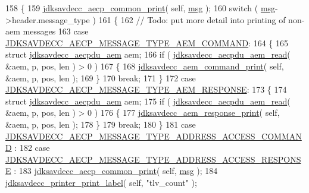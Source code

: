 \begin{DoxyCode}
158 \{
159     \hyperlink{group__aecp__print_gabf23e817595afca199205bb410a5eca6}{jdksavdecc\_aecp\_common\_print}( \textcolor{keyword}{self}, \hyperlink{maap__log__linux_8c_a0c7e58a50354c4a4d6dad428d0e47029}{msg} );
160     \textcolor{keywordflow}{switch} ( \hyperlink{maap__log__linux_8c_a0c7e58a50354c4a4d6dad428d0e47029}{msg}->header.message\_type )
161     \{
162     \textcolor{comment}{// Todo: put more detail into printing of non-aem messages}
163     \textcolor{keywordflow}{case} \hyperlink{group__aecp__message__type_ga4625ce189cc209f42deb0629f48faf69}{JDKSAVDECC\_AECP\_MESSAGE\_TYPE\_AEM\_COMMAND}:
164     \{
165         \textcolor{keyword}{struct }\hyperlink{structjdksavdecc__aecpdu__aem}{jdksavdecc\_aecpdu\_aem} aem;
166         \textcolor{keywordflow}{if} ( \hyperlink{group__aecpdu__aem_gae2421015dcdce745b4f03832e12b4fb6}{jdksavdecc\_aecpdu\_aem\_read}( &aem, p, pos, len ) > 0 )
167         \{
168             \hyperlink{group__aem__print_gae1e2e8e45252cd16a6f95d590870a6ea}{jdksavdecc\_aem\_command\_print}( \textcolor{keyword}{self}, &aem, p, pos, len );
169         \}
170         \textcolor{keywordflow}{break};
171     \}
172     \textcolor{keywordflow}{case} \hyperlink{group__aecp__message__type_ga9cad401e0f60634a8f084d93b0374d31}{JDKSAVDECC\_AECP\_MESSAGE\_TYPE\_AEM\_RESPONSE}:
173     \{
174         \textcolor{keyword}{struct }\hyperlink{structjdksavdecc__aecpdu__aem}{jdksavdecc\_aecpdu\_aem} aem;
175         \textcolor{keywordflow}{if} ( \hyperlink{group__aecpdu__aem_gae2421015dcdce745b4f03832e12b4fb6}{jdksavdecc\_aecpdu\_aem\_read}( &aem, p, pos, len ) > 0 )
176         \{
177             \hyperlink{group__aem__print_ga080525f389502f5863a67b3ac0879685}{jdksavdecc\_aem\_response\_print}( \textcolor{keyword}{self}, &aem, p, pos, len );
178         \}
179         \textcolor{keywordflow}{break};
180     \}
181     \textcolor{keywordflow}{case} \hyperlink{group__aecp__message__type_gab24ef3f0c1054f136d5c56c0c8bc3132}{JDKSAVDECC\_AECP\_MESSAGE\_TYPE\_ADDRESS\_ACCESS\_COMMAND}
      :
182     \textcolor{keywordflow}{case} \hyperlink{group__aecp__message__type_ga4d8df21361c95f23016e03d0ef625dc0}{JDKSAVDECC\_AECP\_MESSAGE\_TYPE\_ADDRESS\_ACCESS\_RESPONSE}
      :
183         \hyperlink{group__aecp__print_gabf23e817595afca199205bb410a5eca6}{jdksavdecc\_aecp\_common\_print}( \textcolor{keyword}{self}, \hyperlink{maap__log__linux_8c_a0c7e58a50354c4a4d6dad428d0e47029}{msg} );
184         \hyperlink{group__util_gaf7818b24143b3c7502926a425a242ff5}{jdksavdecc\_printer\_print\_label}( \textcolor{keyword}{self}, \textcolor{stringliteral}{"tlv\_count"} );

\end{DoxyCode}
